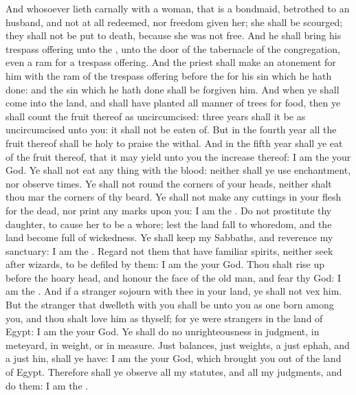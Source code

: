 \begin{biblechapter}
\verse And whosoever lieth carnally with a woman, that is a bondmaid, betrothed to an husband, and not at all redeemed, nor freedom given her; she shall be scourged; they shall not be put to death, because she was not free.
\verse And he shall bring his trespass offering unto the \LORD, unto the door of the tabernacle of the congregation, even a ram for a trespass offering.
\verse And the priest shall make an atonement for him with the ram of the trespass offering before the \LORD for his sin which he hath done: and the sin which he hath done shall be forgiven him.
\verse And when ye shall come into the land, and shall have planted all manner of trees for food, then ye shall count the fruit thereof as uncircumcised: three years shall it be as uncircumcised unto you: it shall not be eaten of.
\verse But in the fourth year all the fruit thereof shall be holy to praise the \LORD withal.
\verse And in the fifth year shall ye eat of the fruit thereof, that it may yield unto you the increase thereof: I am the \LORD your God.
\verse Ye shall not eat any thing with the blood: neither shall ye use enchantment, nor observe times.
\verse Ye shall not round the corners of your heads, neither shalt thou mar the corners of thy beard.
\verse Ye shall not make any cuttings in your flesh for the dead, nor print any marks upon you: I am the \LORD.
\verse Do not prostitute thy daughter, to cause her to be a whore; lest the land fall to whoredom, and the land become full of wickedness.
\verse Ye shall keep my Sabbaths, and reverence my sanctuary: I am the \LORD.
\verse Regard not them that have familiar spirits, neither seek after wizards, to be defiled by them: I am the \LORD your God.
\verse Thou shalt rise up before the hoary head, and honour the face of the old man, and fear thy God: I am the \LORD.
\verse And if a stranger sojourn with thee in your land, ye shall not vex him.
\verse But the stranger that dwelleth with you shall be unto you as one born among you, and thou shalt love him as thyself; for ye were strangers in the land of Egypt: I am the \LORD your God.
\verse Ye shall do no unrighteousness in judgment, in meteyard, in weight, or in measure.
\verse Just balances, just weights, a just ephah, and a just hin, shall ye have: I am the \LORD your God, which brought you out of the land of Egypt.
\verse Therefore shall ye observe all my statutes, and all my judgments, and do them: I am the \LORD.
\end{biblechapter}

